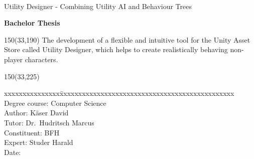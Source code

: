\begin{titlepage}
\color{black}

\begin{flushleft}

\vspace*{115mm}

\fontsize{26pt}{28pt}\selectfont 
\heading				\\							%
\vspace{2mm}

\fontsize{16pt}{20pt}\selectfont\vspace{0.3em}
Utility Designer - Combining Utility AI and Behaviour Trees 			\\	%
\vspace{5mm}

\fontsize{10pt}{12pt}\selectfont
\textbf{Bachelor Thesis} \\		%
\vspace{3mm}

\begin{textblock}{150}(33,190)
\fontsize{10pt}{12pt}\selectfont
The development of a flexible and intuitive tool for the Unity Asset Store called Utility Designer, which helps to create realistically behaving non-player characters.

\end{textblock}

\begin{textblock}{150}(33,225)
\fontsize{10pt}{17pt}\selectfont
\begin{tabbing}
xxxxxxxxxxxxxxx\=xxxxxxxxxxxxxxxxxxxxxxxxxxxxxxxxxxxxxxxxxxxxxxx \kill
Degree course:	\> Computer Science	\\		%
Author:		\> K\"aser David		\\					%
Tutor:	\> Dr.~Hudritsch Marcus		\\							%
Constituent:	\> BFH					\\							%
Expert:		\> Studer Harald				\\							%
Date:			\> \versiondate					\\							%
\end{tabbing}


\end{textblock}
\end{flushleft}
\end{titlepage}
